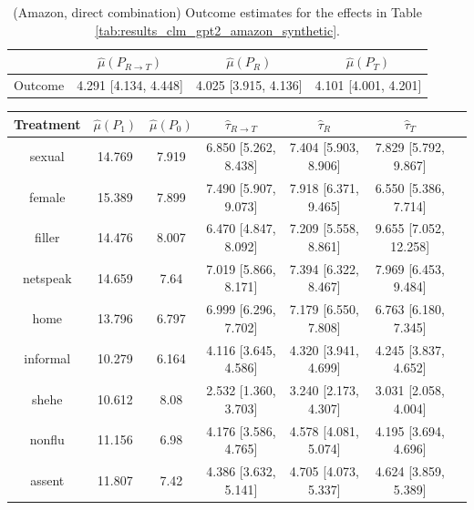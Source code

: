 \documentclass{article}
\begin{document}
\begin{table}[!ht]
\centering
\begin{tabular}{c|ccc}
\toprule
    & $\hat{\mu}(P_{R \rightarrow T})$   & $\hat{\mu}(P_R)$     & $\hat{\mu}(P_T)$     \\
\midrule
 Outcome & 4.291 [4.134, 4.448]               & 4.025 [3.915, 4.136] & 4.101 [4.001, 4.201] \\
\bottomrule
\end{tabular}
\caption{(Amazon, direct combination) Outcome estimates for the effects in Table \ref{tab:results_clm_gpt2_amazon_synthetic}.}
\label{tab:results_clm_gpt2_amazon_synthetic_outcome}
\end{table}

\begin{table}[!ht]
\centering
\begin{tabular}{c|cccccc}
\toprule
    Treatment   &   $\hat{\mu}(P_1)$ &   $\hat{\mu}(P_0)$ & $\hat{\tau}_{R \rightarrow T}$   & $\hat{\tau}_R$       & $\hat{\tau}_T$        \\
\midrule
    sexual      &             14.769 &              7.919 & 6.850 [5.262, 8.438]             & 7.404 [5.903, 8.906] & 7.829 [5.792, 9.867]  \\
    female      &             15.389 &              7.899 & 7.490 [5.907, 9.073]             & 7.918 [6.371, 9.465] & 6.550 [5.386, 7.714]  \\
    filler      &             14.476 &              8.007 & 6.470 [4.847, 8.092]             & 7.209 [5.558, 8.861] & 9.655 [7.052, 12.258] \\
    netspeak    &             14.659 &              7.64  & 7.019 [5.866, 8.171]             & 7.394 [6.322, 8.467] & 7.969 [6.453, 9.484]  \\
    home        &             13.796 &              6.797 & 6.999 [6.296, 7.702]             & 7.179 [6.550, 7.808] & 6.763 [6.180, 7.345]  \\
    informal    &             10.279 &              6.164 & 4.116 [3.645, 4.586]             & 4.320 [3.941, 4.699] & 4.245 [3.837, 4.652]  \\
    shehe       &             10.612 &              8.08  & 2.532 [1.360, 3.703]             & 3.240 [2.173, 4.307] & 3.031 [2.058, 4.004]  \\
    nonflu      &             11.156 &              6.98  & 4.176 [3.586, 4.765]             & 4.578 [4.081, 5.074] & 4.195 [3.694, 4.696]  \\
    assent      &             11.807 &              7.42  & 4.386 [3.632, 5.141]             & 4.705 [4.073, 5.337] & 4.624 [3.859, 5.389]  \\

\end{tabular}
\end{table}
\end{document}
